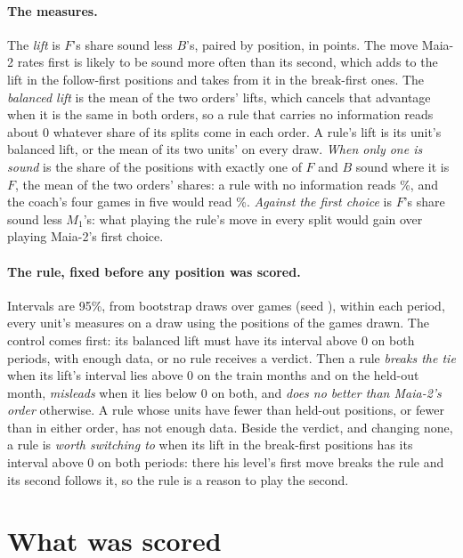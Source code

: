\documentclass[11pt]{article}
\begin{document}
\paragraph{The measures.} The \emph{lift} is $F$'s share sound less $B$'s, paired by position, in
points. The move Maia-2 rates first is likely to be sound more often than its second, which adds
to the lift in the follow-first positions and takes from it in the break-first ones. The
\emph{balanced lift} is the mean of the two orders' lifts, which cancels that advantage when it is
the same in both orders, so a rule that carries no information reads about 0 whatever share of
its splits come in each order. A rule's lift is its unit's balanced lift, or the mean of its two
units' on every draw. \emph{When only one is sound} is the share of the positions with exactly one
of $F$ and $B$ sound where it is $F$, the mean of the two orders' shares: a rule with no
information reads \NoInfoShare\%, and the coach's four games in five would read \CoachShare\%.
\emph{Against the first choice} is $F$'s share sound less $M_1$'s: what playing the rule's move in
every split would gain over playing Maia-2's first choice.

\paragraph{The rule, fixed before any position was scored.} Intervals are 95\%, from \Draws{}
bootstrap draws over games (seed \Seed), within each period, every unit's measures on a draw using
the positions of the games drawn. The control comes first: its balanced lift must have its interval
above 0 on both periods, with enough data, or no rule receives a verdict. Then a rule \emph{breaks
the tie} when its lift's interval lies above 0 on the train months and on the held-out month,
\emph{misleads} when it lies below 0 on both, and \emph{does no better than Maia-2's order}
otherwise. A rule whose units have fewer than \MinHeld{} held-out positions, or fewer than
\MinOrder{} in either order, has not enough data. Beside the verdict, and changing none, a rule is
\emph{worth switching to} when its lift in the break-first positions has its interval above 0 on
both periods: there his level's first move breaks the rule and its second follows it, so the rule
is a reason to play the second.

\section{What was scored}
\end{document}
